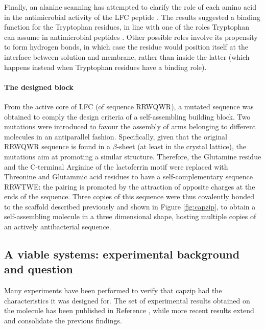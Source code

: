Finally, an alanine scanning has attempted to clarify the role of each amino acid in the antimicrobial activity of the LFC peptide \cite{Strom2002}. The results suggested a binding function for the Tryptophan residues, in line with one of the roles Tryptophan can assume in antimicrobial peptides \cite{Chan2006}. Other possible roles involve its propensity to form hydrogen bonds, in which case the residue would position itself at the interface between solution and membrane, rather than inside the latter (which happens instead when Tryptophan residues have a binding role).

\paragraph{The designed block}
From the active core of LFC (of sequence RRWQWR), a mutated sequence was obtained to comply the design criteria of a self-assembling building block. Two mutations were introduced to favour the assembly of arms belonging to different molecules in an antiparallel fashion. Specifically, given that the original RRWQWR sequence is found in a $\beta$-sheet (at least in the crystal lattice), the mutations aim at promoting a similar structure. Therefore, the Glutamine residue and the C-terminal Arginine of the lactoferrin motif were replaced with Threonine and Glutammic acid residues to have a self-complementary sequence RRWTWE: the pairing is promoted by the attraction of opposite charges at the ends of the sequence.
%
Three copies of this sequence were thus covalently bonded to the scaffold described previously and shown in Figure \ref{fig:capzip}, to obtain a self-assembling molecule in a three dimensional shape, hosting multiple copies of an actively antibacterial sequence.


\subsection{A viable systems: experimental background and question}
Many experiments have been performed to verify that capzip had the characteristics it was designed for. The set of experimental results obtained on the molecule has been published in Reference \cite{Castelletto2016}, while more recent results extend and consolidate the previous findings.

